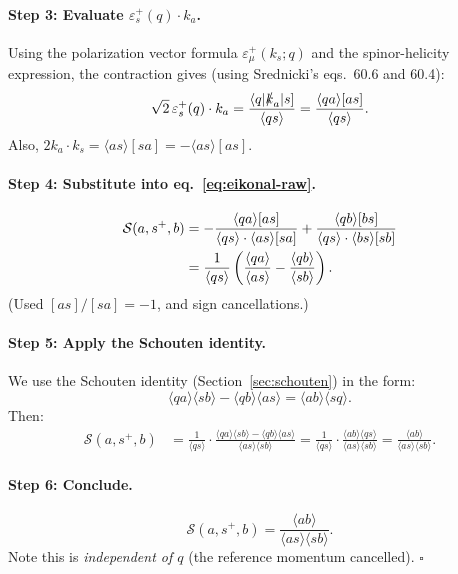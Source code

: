 \paragraph{Step 3: Evaluate $\varepsilon_s^+(q)\cdot k_a$.}
Using the polarization vector formula $\varepsilon_\mu^+(k_s;q)$ and the spinor-helicity
expression, the contraction gives (using Srednicki's eqs.~60.6 and 60.4):
\begin{equation}
  \sqrt{2}\,\varepsilon_s^+(q)\cdot k_a
  = \frac{\langle q|\slashed{k}_a|s]}{\langle qs\rangle}
  = \frac{\langle qa\rangle[as]}{\langle qs\rangle}.
\end{equation}
Also, $2k_a\cdot k_s=\langle as\rangle[sa]=-\langle as\rangle[as]$.

\paragraph{Step 4: Substitute into eq.~\eqref{eq:eikonal-raw}.}
\begin{align}
  \mathcal{S}(a,s^+,b)
  &= -\frac{\langle qa\rangle[as]}{\langle qs\rangle\cdot\langle as\rangle[sa]}
   + \frac{\langle qb\rangle[bs]}{\langle qs\rangle\cdot\langle bs\rangle[sb]}
  \notag\\
  &= \frac{1}{\langle qs\rangle}\left(
     \frac{\langle qa\rangle}{\langle as\rangle}
   - \frac{\langle qb\rangle}{\langle sb\rangle}
    \right).
\end{align}
(Used $[as]/[sa]=-1$, and sign cancellations.)

\paragraph{Step 5: Apply the Schouten identity.}
We use the Schouten identity (Section~\ref{sec:schouten}) in the form:
\begin{equation}
  \langle qa\rangle\langle sb\rangle - \langle qb\rangle\langle as\rangle
  = \langle ab\rangle\langle sq\rangle.
\end{equation}
Then:
\begin{align}
  \mathcal{S}(a,s^+,b)
  &= \frac{1}{\langle qs\rangle}
     \cdot\frac{\langle qa\rangle\langle sb\rangle - \langle qb\rangle\langle as\rangle}
              {\langle as\rangle\langle sb\rangle}
   = \frac{1}{\langle qs\rangle}
     \cdot\frac{\langle ab\rangle\langle qs\rangle}{\langle as\rangle\langle sb\rangle}
   = \frac{\langle ab\rangle}{\langle as\rangle\langle sb\rangle}.
\end{align}

\paragraph{Step 6: Conclude.}
\begin{equation}
  \boxed{\mathcal{S}(a,s^+,b) = \frac{\langle ab\rangle}{\langle as\rangle\langle sb\rangle}.}
  \tag{Dixon 4.2}
\end{equation}
Note this is \emph{independent of $q$} (the reference momentum cancelled). $\square$

